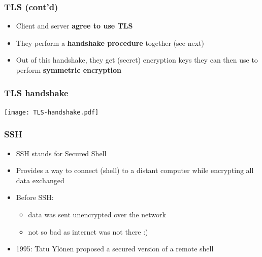 \documentclass[
hyperref={pdfpagelabels=false}
,xcolor=table
]
{beamer}
\begin{document}
\begin{frame}
  \frametitle{TLS (cont'd)}

  \begin{itemize}
  \item Client and server \textbf{agree to use TLS}
  \item They perform a \textbf{handshake procedure} together (see next)
  \item Out of this handshake, they get (secret) encryption keys they can then use to perform \textbf{symmetric encryption}
  \end{itemize}
 
\end{frame}


\begin{frame}
  \frametitle{TLS handshake}

  \begin{center}
    \texttt{[image: TLS-handshake.pdf]}
  \end{center}

\end{frame}


\begin{frame}
  \frametitle{SSH}
  \begin{itemize}
  \item SSH stands for Secured Shell
  \item Provides a way to connect (shell) to a distant computer while encrypting all data exchanged
  \item Before SSH:
    \begin{itemize}
    \item data was sent unencrypted over the network
    \item not so bad as internet was not there :) 
    \end{itemize}
  \item 1995: Tatu Ylönen proposed a secured version of a remote shell
  \end{itemize}
\end{frame}
\end{document}
